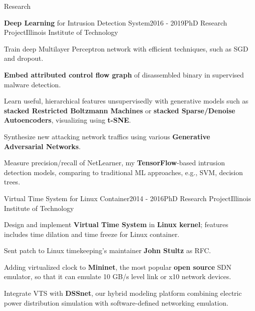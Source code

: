 \documentclass{resume} %
\begin{document}
\begin{rSection}{Research}

\begin{rSubsection}{\textbf{Deep Learning} for Intrusion Detection System}{2016 - 2019}{PhD Research Project}{Illinois Institute of Technology}
\item Train deep Multilayer Perceptron network with efficient techniques, such as SGD and dropout.
\item \textbf{Embed attributed control flow graph} of disassembled binary in supervised malware detection.
\item Learn useful, hierarchical features unsupervisedly with generative models such as \textbf{stacked Restricted Boltzmann Machines} or \textbf{stacked Sparse/Denoise Autoencoders}, visualizing using \textbf{t-SNE}.
\item Synthesize new attacking network traffics using various \textbf{Generative Adversarial Networks}.
\item Measure precision/recall of NetLearner, my \textbf{TensorFlow}-based intrusion detection models, comparing to traditional ML approaches, e.g., SVM, decision trees.
\end{rSubsection}

\begin{rSubsection}{Virtual Time System for Linux Container}{2014 - 2016}{PhD Research Project}{Illinois Institute of Technology}
\item Design and implement \textbf{Virtual Time System} in \textbf{Linux kernel}; features includes time dilation and time freeze for Linux container.
\item Sent patch to Linux timekeeping's maintainer \textbf{John Stultz} as RFC.
\item Adding virtualized clock to \textbf{Mininet}, the most popular \textbf{open source} SDN emulator, so that it can emulate 10 GB/s level link or x10 network devices.
\item Integrate VTS with \textbf{DSSnet}, our hybrid modeling platform combining electric power distribution simulation with software-defined networking emulation.
\end{rSubsection}


\end{rSection}
\end{document}
